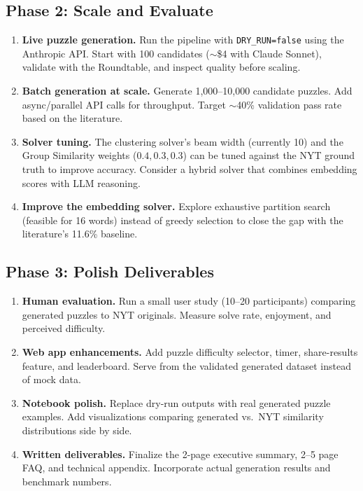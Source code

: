 \documentclass[11pt]{article}
\begin{document}
\subsection{Phase 2: Scale and Evaluate}

\begin{enumerate}[nosep]
    \item \textbf{Live puzzle generation.}
          Run the pipeline with \texttt{DRY\_RUN=false} using the Anthropic API.
          Start with 100 candidates ($\sim$\$4 with Claude Sonnet), validate with
          the Roundtable, and inspect quality before scaling.

    \item \textbf{Batch generation at scale.}
          Generate 1,000--10,000 candidate puzzles. Add async/parallel API calls
          for throughput. Target $\sim$40\% validation pass rate based on the
          literature.

    \item \textbf{Solver tuning.}
          The clustering solver's beam width (currently 10) and the Group
          Similarity weights ($0.4, 0.3, 0.3$) can be tuned against the NYT
          ground truth to improve accuracy. Consider a hybrid solver that
          combines embedding scores with LLM reasoning.

    \item \textbf{Improve the embedding solver.}
          Explore exhaustive partition search (feasible for 16 words) instead of
          greedy selection to close the gap with the literature's 11.6\% baseline.
\end{enumerate}

\subsection{Phase 3: Polish Deliverables}

\begin{enumerate}[nosep, start=5]
    \item \textbf{Human evaluation.}
          Run a small user study (10--20 participants) comparing generated puzzles
          to NYT originals. Measure solve rate, enjoyment, and perceived
          difficulty.

    \item \textbf{Web app enhancements.}
          Add puzzle difficulty selector, timer, share-results feature, and
          leaderboard. Serve from the validated generated dataset instead of
          mock data.

    \item \textbf{Notebook polish.}
          Replace dry-run outputs with real generated puzzle examples. Add
          visualizations comparing generated vs.\ NYT similarity distributions
          side by side.

    \item \textbf{Written deliverables.}
          Finalize the 2-page executive summary, 2--5 page FAQ, and technical
          appendix. Incorporate actual generation results and benchmark numbers.
\end{enumerate}
\end{document}
